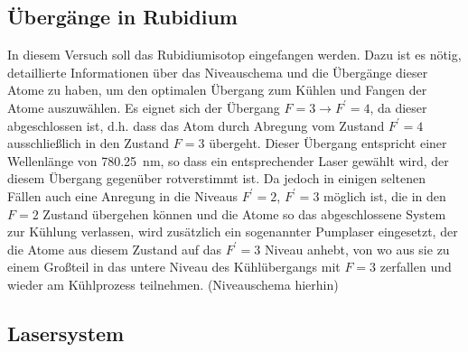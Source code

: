 \documentclass[11pt, a4paper]{article}
\numberwithin{equation}{section}
\newcommand{\korr}[1]{{\color{red}(#1)}}
\begin{document}
\subsection{Übergänge in Rubidium}
\label{sec:rb_uebergaenge}

In diesem Versuch soll das Rubidiumisotop  eingefangen werden.
Dazu ist es nötig, detaillierte Informationen über das Niveauschema und die Übergänge dieser Atome zu haben, um den optimalen Übergang zum Kühlen und Fangen der Atome auszuwählen.
Es eignet sich der Übergang $F=3 \rightarrow F^\prime=4$, da dieser abgeschlossen ist, d.h. dass das Atom durch Abregung vom Zustand $F^\prime=4$ ausschließlich in den Zustand $F=3$ übergeht.
Dieser Übergang entspricht einer Wellenlänge von \SI{780.25}{nm}, so dass ein entsprechender Laser gewählt wird, der diesem Übergang gegenüber rotverstimmt ist.
Da jedoch in einigen seltenen Fällen auch eine Anregung in die Niveaus $F^\prime=2$, $F^\prime=3$ möglich ist, die in den $F=2$ Zustand übergehen können und die Atome so das abgeschlossene System zur Kühlung verlassen, wird zusätzlich ein sogenannter Pumplaser eingesetzt, der die Atome aus diesem Zustand auf das $F^\prime=3$ Niveau anhebt, von wo aus sie zu einem Großteil in das untere Niveau des Kühlübergangs mit $F=3$ zerfallen und wieder am Kühlprozess teilnehmen.
\korr{Niveauschema hierhin} 

\subsection{Lasersystem}
\end{document}
